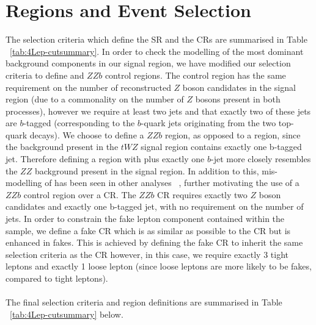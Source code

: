 \section{Regions and Event Selection}
\label{sec:regionsAndEventSelection}


The selection criteria which define the SR and the CRs are summarised in Table ~\ref{tab:4Lep-cutsummary}. In order to check the modelling of the most dominant background components in our signal region, we have modified our selection criteria to define \ttZ and $ZZb$ control regions. The \ttZ control region has the same requirement on the number of reconstructed $Z$ boson candidates in the signal region (due to a commonality on the number of $Z$ bosons present in both processes), however we require at least two jets and that exactly two of these jets are $b$-tagged (corresponding to the $b$-quark jets originating from the two top-quark decays). We choose to define a $ZZb$ region, as opposed to a \ZZ region, since the \ZZ background present in the $tWZ$ signal region contains exactly one b-tagged jet. Therefore defining a region with \ZZ plus exactly one $b$-jet more closely resembles the $ZZ$ background present in the signal region. In addition to this, mis-modelling of \ZZ has been seen in other analyses ~\cite{Aaboud:2019, ppToZZ:CMSpaper}, further motivating the use of a $ZZb$ control region over a \ZZ CR. The $ZZb$ CR requires exactly two $Z$ boson candidates and exactly one b-tagged jet, with no requirement on the number of jets. In order to constrain the fake lepton component contained within the \ttZ sample, we define a \ttZ fake CR which is as similar as possible to the \ttZ CR but is enhanced in fakes. This is achieved by defining the \ttZ fake CR to inherit the same selection criteria as the \ttZ CR however, in this case, we require exactly 3 tight leptons and exactly 1 loose lepton (since loose leptons are more likely to be fakes, compared to tight leptons).\\\\
 The final selection criteria and region definitions are summarised in Table ~\ref{tab:4Lep-cutsummary} below.



